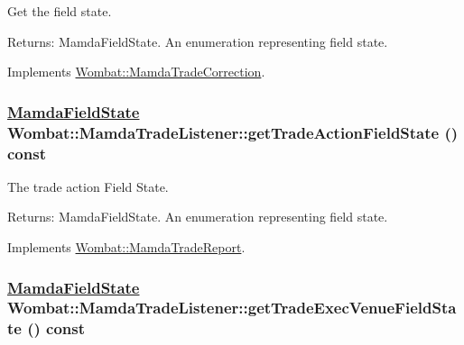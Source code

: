 Get the field state. 

\begin{Desc}
\item[Returns:]Mamda\-Field\-State. An enumeration representing field state. \end{Desc}


Implements \hyperlink{classWombat_1_1MamdaTradeCorrection_a00b0ac006b165b500fb5e97f1852c1a}{Wombat::Mamda\-Trade\-Correction}.\hypertarget{classWombat_1_1MamdaTradeListener_bf9d994153ef2fa8b823517c2a061a28}{
\subsubsection[getTradeActionFieldState]{\setlength{\rightskip}{0pt plus 5cm}\hyperlink{namespaceWombat_93aac974f2ab713554fd12a1fa3b7d2a}{Mamda\-Field\-State} Wombat::Mamda\-Trade\-Listener::get\-Trade\-Action\-Field\-State () const}}
\label{classWombat_1_1MamdaTradeListener_bf9d994153ef2fa8b823517c2a061a28}


The trade action Field State. 

\begin{Desc}
\item[Returns:]Mamda\-Field\-State. An enumeration representing field state. \end{Desc}


Implements \hyperlink{classWombat_1_1MamdaTradeReport_c5344ba42657f2ba5a35c30240a384f1}{Wombat::Mamda\-Trade\-Report}.\hypertarget{classWombat_1_1MamdaTradeListener_7d9d76da5b8194ec576c69fba05eb5d7}{
\subsubsection[getTradeExecVenueFieldState]{\setlength{\rightskip}{0pt plus 5cm}\hyperlink{namespaceWombat_93aac974f2ab713554fd12a1fa3b7d2a}{Mamda\-Field\-State} Wombat::Mamda\-Trade\-Listener::get\-Trade\-Exec\-Venue\-Field\-State () const}}
\label{classWombat_1_1MamdaTradeListener_7d9d76da5b8194ec576c69fba05eb5d7}


